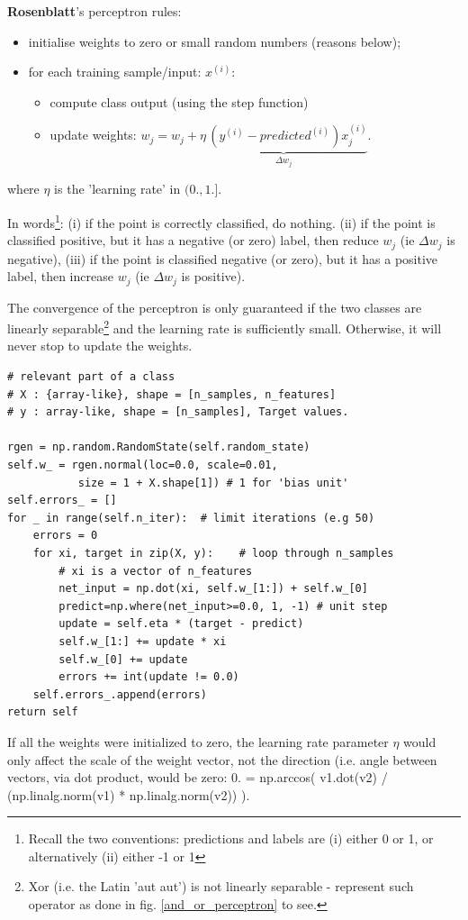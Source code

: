 \documentclass[11pt]{article}
\begin{document}

\textbf{Rosenblatt}'s perceptron rules:
\begin{itemize}
	\item initialise weights to zero or small random numbers (reasons below);
	\item for each training sample/input: $x^{(i)}$:
	\begin{itemize}
		\item compute class output (using the step function)
		\item update weights: $w_j = w_j +  \underbrace{ \eta \, (y^{(i)} - predicted^{(i)}) x_j^{(i)}}_{\Delta w_j}$.
	\end{itemize}
\end{itemize}
where $\eta$ is the 'learning rate' in $(0., 1.]$. 

In words\footnote{Recall the two conventions: predictions and labels are (i) either 0 or 1, or alternatively (ii) either -1 or 1}: (i) if the point is correctly classified, do nothing. (ii) if the point is classified positive, but it has a negative (or zero) label, then reduce $w_j$ (ie $\Delta w_j$ is negative), (iii) if the point is classified negative (or zero), but it has a positive label, then increase $w_j$ (ie $\Delta w_j$ is positive).

The convergence of the perceptron is only guaranteed if the two classes are linearly separable\footnote{Xor (i.e. the Latin 'aut aut') is not linearly separable - represent such operator as done in fig. \ref{and_or_perceptron} to see.} and the learning rate is sufficiently small. Otherwise, it will never stop to update the weights. 
\begin{lstlisting}
# relevant part of a class
# X : {array-like}, shape = [n_samples, n_features]
# y : array-like, shape = [n_samples], Target values.

rgen = np.random.RandomState(self.random_state)
self.w_ = rgen.normal(loc=0.0, scale=0.01,
		   size = 1 + X.shape[1]) # 1 for 'bias unit'
self.errors_ = []
for _ in range(self.n_iter):  # limit iterations (e.g 50)
	errors = 0
	for xi, target in zip(X, y):	# loop through n_samples
		# xi is a vector of n_features
		net_input = np.dot(xi, self.w_[1:]) + self.w_[0]
		predict=np.where(net_input>=0.0, 1, -1) # unit step
		update = self.eta * (target - predict)
		self.w_[1:] += update * xi
		self.w_[0] += update
		errors += int(update != 0.0)
	self.errors_.append(errors)
return self
\end{lstlisting}
If all the weights were initialized to zero, the learning rate parameter $\eta$ would only affect the scale of the weight vector, not the direction (i.e. angle between vectors, via dot product, would be zero: 0. = np.arccos( v1.dot(v2) / (np.linalg.norm(v1) * np.linalg.norm(v2)) ).
\end{document}
